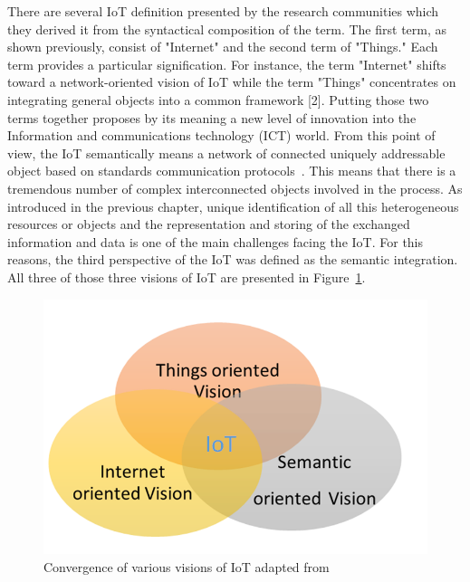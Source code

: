 There are several IoT definition presented by the research communities which they derived it from the syntactical composition of the term. The first term, as shown previously, consist of "Internet" and the second term of "Things." Each term provides a particular signification. For instance, the term "Internet" shifts toward a network-oriented vision of IoT while the term "Things" concentrates on integrating general objects into a common framework [2]. Putting those two terms together proposes by its meaning a new level of innovation into the Information and communications technology (ICT) world. From this point of view, the IoT semantically means a network of connected uniquely addressable object based on standards communication protocols~\cite{semanticiot}. This means that there is a tremendous number of complex interconnected objects involved in the process. As introduced in the previous chapter, unique identification of all this heterogeneous resources or objects and the representation and storing of the exchanged information and data is one of the main challenges facing the IoT. For this reasons, the third perspective of the IoT was defined as the semantic integration. All three of those three visions of IoT are presented in Figure~\ref{fig:contrib2:vision}.
\begin{figure}[htbp]
    \centering
    \includegraphics[width=1\textwidth]{resources/images/vision}
    \caption{Convergence of various visions of IoT adapted from~\cite{semanticiot} }\label{fig:contrib2:vision}
\end{figure}

